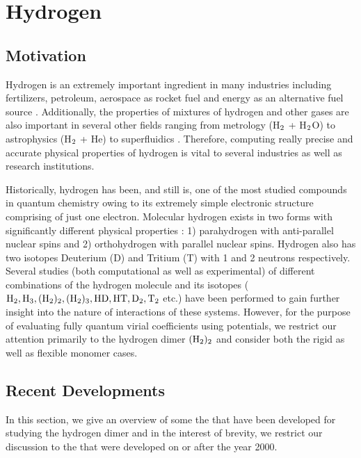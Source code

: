 \chapter{Hydrogen}
\label{chap:h2}
    \section{Motivation}
        Hydrogen is an extremely important ingredient in many industries including fertilizers, petroleum, aerospace as rocket fuel and energy as an alternative fuel source \cite{Jacobsen2007}. Additionally, the properties of mixtures of hydrogen and other gases are also important in several other fields ranging from metrology (H$_{\rm 2}$ + H$_{\rm 2}$O) \cite{Hodges2004} to astrophysics (H$_{\rm 2}$ + He) \cite{Boothroyd2002,Boothroyd2003} to superfluidics \cite{Patkowski2008,Grebenev2000}. Therefore, computing really precise and accurate physical properties of hydrogen is vital to several industries as well as research institutions.

        Historically, hydrogen has been, and still is, one of the most studied compounds in quantum chemistry owing to its extremely simple electronic structure comprising of just one electron. Molecular hydrogen exists in two forms with significantly different physical properties \cite{Jacobsen2007}: 1) parahydrogen with anti-parallel nuclear spins and 2) orthohydrogen with parallel nuclear spins. Hydrogen also has two isotopes Deuterium (D) and Tritium (T) with 1 and 2 neutrons respectively. Several studies \cite{Goodwin1963,Kolos1986,Schwenke1988,Mielke2002,Manzhos2010,Garberoglio2010,Garberoglio2012,Sakoda2012,Garberoglio2013,Garberoglio2014} (both computational as well as experimental) of different combinations of the hydrogen molecule and its isotopes ($\allowbreak {\rm H_2, H_3, (H_2)_2, (H_2)_3, HD, HT, D_2, T_2}$ etc.) have been performed to gain further insight into the nature of interactions of these systems. However, for the purpose of evaluating fully quantum virial coefficients using \abinitio{} potentials, we restrict our attention primarily to the hydrogen dimer ${\rm (H_2)_2}$ and consider both the rigid as well as flexible monomer cases.

    \section{Recent Developments}
        In this section, we give an overview of some the \abinitio{} \PESs{} that have been developed for studying the hydrogen dimer and in the interest of brevity, we restrict our discussion to the \PESs{} that were developed on or after the year 2000.\\


